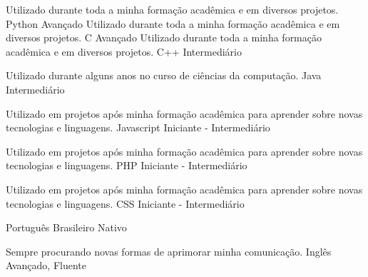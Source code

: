 

\begin{cventries}

    \cventry
    {Utilizado durante toda a minha formação acadêmica e em diversos projetos.}
    {Python} %
    {Avançado} %
    {}
    {}
    \cventry
    {Utilizado durante toda a minha formação acadêmica e em diversos projetos.}
    {C} %
    {Avançado} %
    {}
    {}
    \cventry
    {Utilizado durante toda a minha formação acadêmica e em diversos projetos.}
    {C++} %
    {Intermediário} %
    {}
    {}

    \cventry
    {Utilizado durante alguns anos no curso de ciências da computação.}
    {Java} %
    {Intermediário} %
    {}
    {}

    \cventry
    {Utilizado em projetos após minha formação acadêmica para aprender sobre
    novas tecnologias e linguagens.}
    {Javascript} %
    {Iniciante - Intermediário} %
    {}
    {}

    \cventry
    {Utilizado em projetos após minha formação acadêmica para aprender sobre
    novas tecnologias e linguagens.}
    {PHP} %
    {Iniciante - Intermediário} %
    {}
    {}

    \cventry
    {Utilizado em projetos após minha formação acadêmica para aprender sobre
    novas tecnologias e linguagens.}
    {CSS} %
    {Iniciante - Intermediário} %
    {}
    {}
\end{cventries}

\begin{cventries}

  \cventry
  {}
  {Português Brasileiro}
  {Nativo}
  {}
  {}

  \cventry
  {Sempre procurando novas formas de aprimorar minha comunicação.}
  {Inglês}
  {Avançado, Fluente}
  {}
  {}

\end{cventries}

